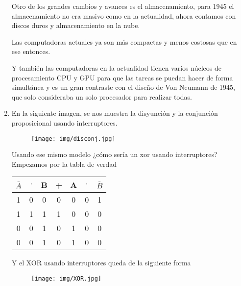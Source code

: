 \documentclass{article}
\begin{document}
\begin{enumerate}
    Otro de los grandes cambios y avances es el almacenamiento, para 1945 el almacenamiento no era masivo como en la actualidad, ahora contamos con discos duros y almacenamiento en la nube.

    Las computadoras actuales ya son más compactas y menos costosas que en ese entonces.

    Y también las computadoras en la actualidad tienen varios núcleos de procesamiento CPU y GPU para que las tareas se puedan hacer de forma simultánea y es un gran contraste con el diseño de Von Neumann de 1945, que solo consideraba un solo procesador para realizar todas.
    
    \item En la siguiente imagen, se nos muestra la disyunción y la conjunción proposicional usando interruptores. 
    \begin{figure}[H]
    \centering
    \texttt{[image: img/disconj.jpg]} 
    \label{fig:mi_imagen}
    \end{figure}
    Usando ese mismo modelo ¿cómo sería un xor usando interruptores? \\
    Empezamos por la tabla de verdad
    \begin{table}[H]
    \renewcommand{\arraystretch}{1.5}
    \centering
    \begin{tabular}{|| c | c | c | c | c | c | c ||}
    \hline
    \hline
    $\bar{A}$ & $\cdot$ & B & + & A & $\cdot$ & $\bar{B}$ \\ \hline
    1 & 0 & 0 & 0 & 0 & 0 & 1\\ \hline
    1 & 1 & 1 & 1 & 0 & 0 & 0\\ \hline
    0 & 0 & 1 & 0 & 1 & 0 & 0\\ \hline
    0 & 0 & 1 & 0 & 1 & 0 & 0\\\hline \hline
    \end{tabular}
    \end{table} 
    Y el XOR usando interruptores queda de la siguiente forma
    \begin{figure}[h]
    \centering
    \texttt{[image: img/XOR.jpg]} 
    \label{fig:mi_imagen}
\end{figure}
\end{enumerate}
\end{document}
